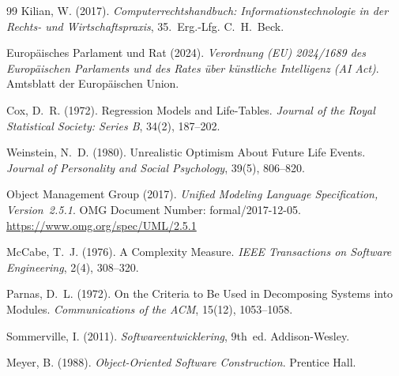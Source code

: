 ﻿\documentclass[a4paper,12pt]{article}
\theoremstyle{definition}
\begin{document}
\begin{thebibliography}{99}
    Kilian, W. (2017).
    \textit{Computerrechtshandbuch: Informationstechnologie in der Rechts- und
    Wirtschaftspraxis}, 35.~Erg.-Lfg.
    C.~H.~Beck.

    Europ\"aisches Parlament und Rat (2024).
    \textit{Verordnung (EU) 2024/1689 des Europ\"aischen Parlaments und des Rates
    \"uber k\"unstliche Intelligenz (AI Act)}.
    Amtsblatt der Europ\"aischen Union.

    Cox, D.~R. (1972).
    Regression Models and Life-Tables.
    \textit{Journal of the Royal Statistical Society: Series B}, 34(2), 187--202.

    Weinstein, N.~D. (1980).
    Unrealistic Optimism About Future Life Events.
    \textit{Journal of Personality and Social Psychology}, 39(5), 806--820.

    Object Management Group (2017).
    \textit{Unified Modeling Language Specification, Version~2.5.1}.
    OMG Document Number: formal/2017-12-05.
    \url{https://www.omg.org/spec/UML/2.5.1}

    McCabe, T.~J. (1976).
    A Complexity Measure.
    \textit{IEEE Transactions on Software Engineering}, 2(4), 308--320.

    Parnas, D.~L. (1972).
    On the Criteria to Be Used in Decomposing Systems into Modules.
    \textit{Communications of the ACM}, 15(12), 1053--1058.

    Sommerville, I. (2011).
    \textit{Softwareentwicklering}, 9th~ed.
    Addison-Wesley.

    Meyer, B. (1988).
    \textit{Object-Oriented Software Construction}.
    Prentice Hall.

\end{thebibliography}
\end{document}
